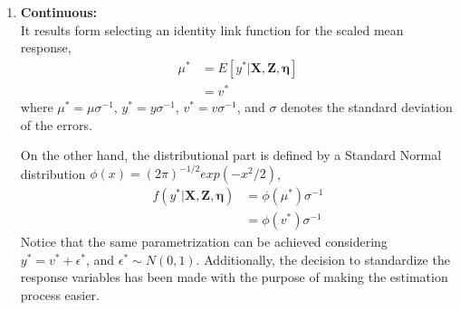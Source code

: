 \begin{enumerate}
	
	\item \textbf{Continuous:} \\
	It results form selecting an identity link function for the scaled mean response,
	\begin{equation} \label{eq:link_cont}
		\begin{split}
		\mu^{*} &= E[y^{*} | \mathbf{X}, \mathbf{Z}, \pmb{\eta}] \\ 
		&= v^{*}
		\end{split}
	\end{equation}
	where $\mu^{*} = \mu \sigma^{-1}$, $y^{*} = y \sigma^{-1}$, $v^{*} = v \sigma^{-1}$, and $\sigma$ denotes the standard deviation of the errors.
	
	On the other hand, the distributional part is defined by a Standard Normal distribution $\phi(x)=(2 \pi)^{-1/2} exp(-x^{2}/2 )$,
	\begin{equation} \label{eq:dist_cont}
		\begin{split}
		f(y^{*}| \mathbf{X}, \mathbf{Z}, \pmb{\eta}) &= \phi(\mu^{*}) \sigma^{-1} \\
		&= \phi(v^{*}) \sigma^{-1}
		\end{split}
	\end{equation}
	Notice that the same parametrization can be achieved considering $y^{*} = v^{*} + \epsilon^{*}$, and $\epsilon^{*} \sim N(0, 1)$.
	Additionally, the decision to standardize the response variables has been made with the purpose of making the estimation process easier.
	
	
	

\end{enumerate}
